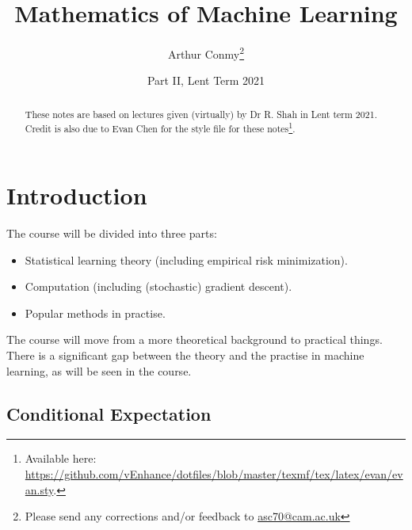 \documentclass[11pt]{scrartcl}
\begin{document}
\title{Mathematics of Machine Learning}
\author{Arthur Conmy\footnote{Please send any corrections and/or feedback to \url{asc70@cam.ac.uk}}}
\date{Part II, Lent Term 2021}

\maketitle
\begin{abstract}
These notes are based on lectures given (virtually) by Dr R. Shah in Lent term 2021. 
Credit is also due to Evan Chen for the style file for these notes\footnote{Available here: \url{https://github.com/vEnhance/dotfiles/blob/master/texmf/tex/latex/evan/evan.sty}.}.
\end{abstract}

\tableofcontents

\section{Introduction}

The course will be divided into three parts:

\begin{itemize}
    \item Statistical learning theory (including empirical risk minimization).
    \item Computation (including (stochastic) gradient descent).
    \item Popular methods in practise.
\end{itemize}

The course will move from a more theoretical background to practical things. There is a significant gap between the theory and the practise in machine learning, as will be seen in the course.




\subsection{Conditional Expectation}
\end{document}
